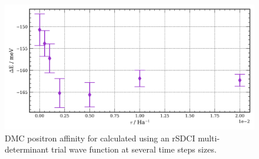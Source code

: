 \begin{figure}
    \includegraphics[width=\columnwidth,keepaspectratio]{Images/chapter5/be_rSDCI_multidet.png}
    \caption{\label{fig:be_e_diff_ts} DMC positron affinity for  calculated using an rSDCI multi-determinant trial wave function at several time steps sizes. }
\end{figure}



